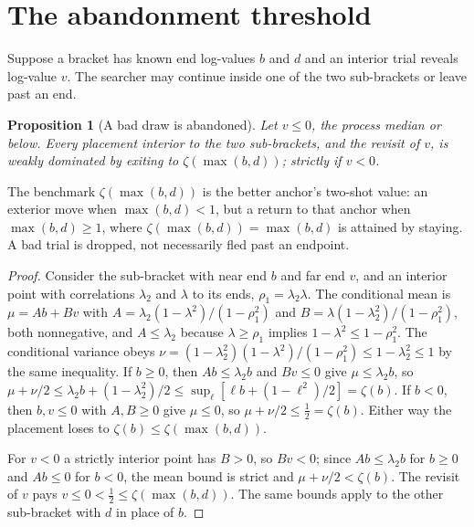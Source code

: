\documentclass[11pt]{article}
\theoremstyle{itheads}
\newtheorem{proposition}{Proposition}
\begin{document}
\appendix
\section{The abandonment threshold}\label{app:abandon}

Suppose a bracket has known end log-values $b$ and $d$ and an
interior trial reveals log-value $v$. The searcher may continue
inside one of the two sub-brackets or leave past an end.

\begin{proposition}[A bad draw is abandoned]\label{prop:abandon}
Let $v \le 0$, the process median or below. Every placement interior
to the two sub-brackets, and the revisit of $v$, is weakly dominated
by exiting to $\zeta(\max(b,d))$; strictly if $v < 0$.
\end{proposition}

\noindent The benchmark $\zeta(\max(b,d))$ is the better anchor's
two-shot value: an exterior move when $\max(b,d)<1$, but a return to
that anchor when $\max(b,d)\ge 1$, where $\zeta(\max(b,d))=\max(b,d)$
is attained by staying. A bad trial is dropped, not necessarily fled
past an endpoint.

\begin{proof}
Consider the sub-bracket with near end $b$ and far end $v$, and an
interior point with correlations $\lambda_2$ and $\lambda$ to its
ends, $\rho_1 = \lambda_2\lambda$. The conditional mean is
$\mu = Ab + Bv$ with
$A = \lambda_2(1-\lambda^{2})/(1-\rho_1^{2})$ and
$B = \lambda(1-\lambda_2^{2})/(1-\rho_1^{2})$, both nonnegative, and
$A \le \lambda_2$ because $\lambda \ge \rho_1$ implies
$1-\lambda^{2} \le 1-\rho_1^{2}$. The conditional variance obeys
$\nu = (1-\lambda_2^{2})(1-\lambda^{2})/(1-\rho_1^{2})
\le 1-\lambda_2^{2} \le 1$ by the same inequality. If $b \ge 0$,
then $Ab \le \lambda_2 b$ and $Bv \le 0$ give $\mu \le \lambda_2 b$,
so $\mu + \nu/2 \le \lambda_2 b + (1-\lambda_2^{2})/2 \le
\sup_{\ell}[\ell b + (1-\ell^{2})/2] = \zeta(b)$. If $b < 0$, then
$b, v \le 0$ with $A, B \ge 0$ give $\mu \le 0$, so
$\mu + \nu/2 \le \tfrac12 = \zeta(b)$. Either way the placement
loses to $\zeta(b) \le \zeta(\max(b,d))$.

For $v < 0$ a strictly interior point has $B > 0$, so $Bv < 0$; since
$Ab \le \lambda_2 b$ for $b\ge0$ and $Ab \le 0$ for $b<0$, the mean
bound is strict and $\mu + \nu/2 < \zeta(b)$. The revisit of
$v$ pays $v \le 0 < \tfrac12 \le \zeta(\max(b,d))$. The same bounds
apply to the other sub-bracket with $d$ in place of $b$.
\end{proof}
\end{document}
